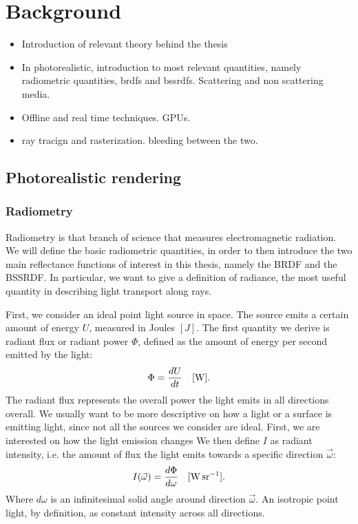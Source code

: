 

\chapter{Background}
\label{sec:background}
\begin{itemize}
\item Introduction of relevant theory behind the thesis
\item In photorealistic, introduction to most relevant quantities, namely radiometric quantities, brdfs and bssrdfs. Scattering and non scattering media.
\item Offline and real time techniques. GPUs. 
\item ray tracign and rasterization. bleeding between the two.
\end{itemize}

\section{Photorealistic rendering}

\subsection{Radiometry}
Radiometry is that branch of science that measures electromagnetic radiation. We will define the basic radiometric quantities, in order to then introduce the two main reflectance functions of interest in this thesis, namely the BRDF and the BSSRDF. In particular, we want to give a definition of radiance, the most useful quantity in describing light transport along rays.

First, we consider an ideal point light source in space. The source emits a certain amount of energy $U$, measured in Joules $[J]$. The first quantity we derive is radiant flux or radiant power $\Phi$, defined as the amount of energy per second emitted by the light:
$$
\Phi = \frac{d U}{d t}  \ \ \ [\SI{}{\watt}].
$$
The radiant flux represents the overall power the light emits in all directions overall. We usually want to be more descriptive on how a light or a surface is emitting light, since not all the sources we consider are ideal. First, we are interested on how the light emission changes  We then define $I$ as radiant intensity, i.e. the amount of flux the light emits towards a specific direction $\vec{\omega}$:
$$
I(\vec{\omega}) = \frac{d \Phi}{d \omega}  \siunit{\watt \per \steradian}.
$$   
Where $d \omega$ is an infinitesimal solid angle around direction $\vec{\omega}$. An isotropic point light, by definition, as constant intensity across all directions.


